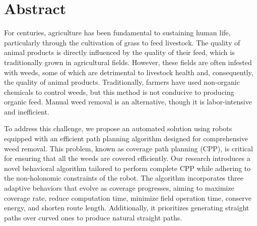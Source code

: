 
\chapter*{Abstract} 

For centuries, agriculture has been fundamental to sustaining human life, particularly through the cultivation of grass to feed livestock. The quality of animal products is directly influenced by the quality of their feed, which is traditionally grown in agricultural fields. However, these fields are often infested with weeds, some of which are detrimental to livestock health and, consequently, the quality of animal products. Traditionally, farmers have used non-organic chemicals to control weeds, but this method is not conducive to producing organic feed. Manual weed removal is an alternative, though it is labor-intensive and inefficient.

\vspace*{3mm} 

To address this challenge, we propose an automated solution using robots equipped with an efficient path planning algorithm designed for comprehensive weed removal. This problem, known as coverage path planning (CPP), is critical for ensuring that all the weeds are covered efficiently. Our research introduces a novel behavioral algorithm tailored to perform complete CPP while adhering to the non-holonomic constraints of the robot. The algorithm incorporates three adaptive behaviors that evolve as coverage progresses, aiming to maximize coverage rate, reduce computation time, minimize field operation time, conserve energy, and shorten route length. Additionally, it prioritizes generating straight paths over curved ones to produce natural straight paths.

\vspace*{3mm} 

